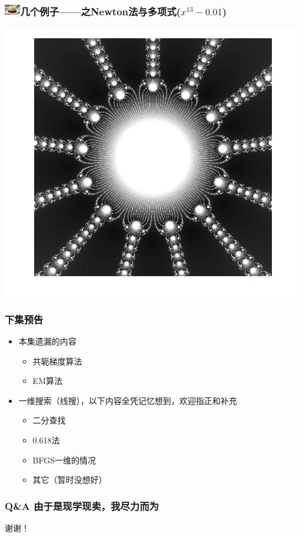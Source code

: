 \documentclass{beamer}
\begin{document}
\begin{frame}
\frametitle{\includegraphics[width=7mm,height=5mm]{Images/strawhat.jpg}几个例子——之Newton法与多项式($x^{13}-0.01$)}
\vspace{-3mm}
\begin{center}
\includegraphics[width=0.8\linewidth]{Images/newton_poly_13.jpg}
\end{center}
\end{frame}
\begin{frame}\frametitle{下集预告}
\label{Next}
\begin{itemize}
\item 本集遗漏的内容
\begin{itemize}
\item 共轭梯度算法
\item EM算法
\end{itemize}
\item 一维搜索（线搜），以下内容全凭记忆想到，欢迎指正和补充
\begin{itemize}
\item 二分查找
\item 0.618法
\item BFGS一维的情况
\item 其它（暂时没想好）
\end{itemize}
\end{itemize}
\end{frame}
\begin{frame}\frametitle{Q\&A \tiny{由于是现学现卖，我尽力而为}}
\label{Q_and_A}
\begin{center}
\huge{谢谢！}
\end{center}
\end{frame}
\end{document}
